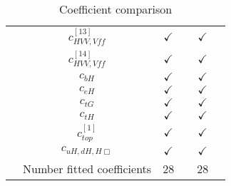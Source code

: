 \documentclass{article}
\begin{document}
\begin{table}[H]
\begin{tabular}{|c|c|c|c|c|c|}
 & $c_{HVV,Vff}^{[13]}$ & $\checkmark$ &  & $\checkmark$ & \\ \cline{2-6}
 & $c_{HVV,Vff}^{[14]}$ & $\checkmark$ &  & $\checkmark$ & \\ \cline{2-6}
 & $c_{bH}$ & $\checkmark$ &  & $\checkmark$ & \\ \cline{2-6}
 & $c_{eH}$ & $\checkmark$ &  & $\checkmark$ & \\ \cline{2-6}
 & $c_{tG}$ & $\checkmark$ &  & $\checkmark$ & \\ \cline{2-6}
 & $c_{tH}$ & $\checkmark$ &  & $\checkmark$ & \\ \cline{2-6}
 & $c_{top}^{[1]}$ & $\checkmark$ &  & $\checkmark$ & \\ \cline{2-6}
 & $c_{uH,dH,H\Box}$ & $\checkmark$ &  & $\checkmark$ & 
\\ \hline
\hline & Number fitted coefficients & 28 &  & 28 &  \\ \hline
\end{tabular}
\caption{Coefficient comparison}
\end{table}
\end{document}
